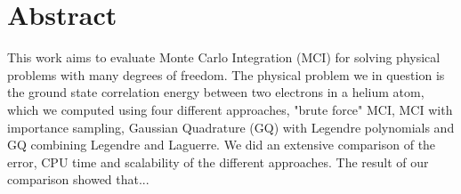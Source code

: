 \section*{Abstract}
This work aims to evaluate Monte Carlo Integration (MCI) for solving physical
problems with many degrees of freedom. The physical problem we in question is
the ground state correlation energy between two electrons in a helium atom,
which we computed using four different approaches, "brute force" MCI, MCI with
importance sampling, Gaussian Quadrature (GQ) with Legendre polynomials and GQ
combining Legendre and Laguerre. We did an extensive comparison of the error,
CPU time and scalability of the different approaches. The result of our
comparison showed that... 
